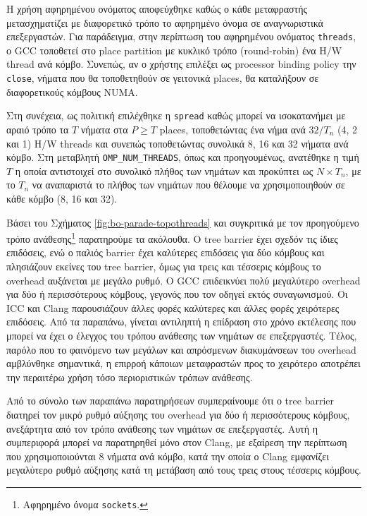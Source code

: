 Η χρήση αφηρημένου ονόματος αποφεύχθηκε καθώς ο κάθε μεταφραστής μετασχηματίζει με διαφορετικό τρόπο το αφηρημένο όνομα σε αναγνωριστικά επεξεργαστών. Για παράδειγμα, στην περίπτωση του αφηρημένου ονόματος \texttt{threads}, ο GCC τοποθετεί στο place partition με κυκλικό τρόπο (round-robin) ένα H/W thread ανά κόμβο. Συνεπώς, αν ο χρήστης επιλέξει ως processor binding policy την \texttt{close}, νήματα που θα τοποθετηθούν σε γειτονικά places, θα καταλήξουν σε διαφορετικούς κόμβους NUMA.

Στη συνέχεια, ως πολιτική επιλέχθηκε η \texttt{spread} καθώς μπορεί να ισοκατανήμει με αραιό τρόπο τα $T$ νήματα στα $P \geq T$ places, τοποθετώντας ένα νήμα ανά $32 / T_n$ (4, 2 και 1) H/W threads και συνεπώς τοποθετώντας συνολικά 8, 16 και 32 νήματα ανά κόμβο. Στη μεταβλητή \texttt{OMP\_NUM\_THREADS}, όπως και προηγουμένως, ανατέθηκε η τιμή $T$ η οποία αντιστοιχεί στο συνολικό πλήθος των νημάτων και προκύπτει ως $N \times T_n$, με το $T_n$ να αναπαριστά το πλήθος των νημάτων που θέλουμε να χρησιμοποιηθούν σε κάθε κόμβο (8, 16 και 32).

Βάσει του Σχήματος \ref{fig:bo-parade-topothreads} και συγκριτικά με τον προηγούμενο τρόπο ανάθεσης\footnote{Αφηρημένο όνομα \texttt{sockets}.} παρατηρούμε τα ακόλουθα. Ο tree barrier έχει σχεδόν τις ίδιες επιδόσεις, ενώ ο παλιός barrier έχει καλύτερες επιδόσεις για δύο κόμβους και πλησιάζουν εκείνες του tree barrier, όμως για τρεις και τέσσερις κόμβους το overhead αυξάνεται με μεγάλο ρυθμό. Ο GCC επιδεικνύει πολύ μεγαλύτερο overhead για δύο ή περισσότερους κόμβους, γεγονός που τον οδηγεί εκτός συναγωνισμού. Οι ICC και Clang παρουσιάζουν άλλες φορές καλύτερες και άλλες φορές χειρότερες επιδόσεις. Από τα παραπάνω, γίνεται αντιληπτή η επίδραση στο χρόνο εκτέλεσης που μπορεί να έχει ο έλεγχος του τρόπου ανάθεσης των νημάτων σε επεξεργαστές. Τέλος, παρόλο που το φαινόμενο των μεγάλων και απρόσμενων διακυμάνσεων του overhead αμβλύνθηκε σημαντικά, η επιρροή κάποιων μεταφραστών προς το χειρότερο αποτρέπει την περαιτέρω χρήση τόσο περιοριστικών τρόπων ανάθεσης.

Από το σύνολο των παραπάνω παρατηρήσεων συμπεραίνουμε ότι ο tree barrier διατηρεί τον μικρό ρυθμό αύξησης του overhead για δύο ή περισσότερους κόμβους, ανεξάρτητα από τον τρόπο ανάθεσης των νημάτων σε επεξεργαστές. Αυτή η συμπεριφορά μπορεί να παρατηρηθεί μόνο στον Clang, με εξαίρεση την περίπτωση που χρησιμοποιούνται 8 νήματα ανά κόμβο, κατά την οποία ο Clang εμφανίζει μεγαλύτερο ρυθμό αύξησης κατά τη μετάβαση από τους τρεις στους τέσσερις κόμβους.

